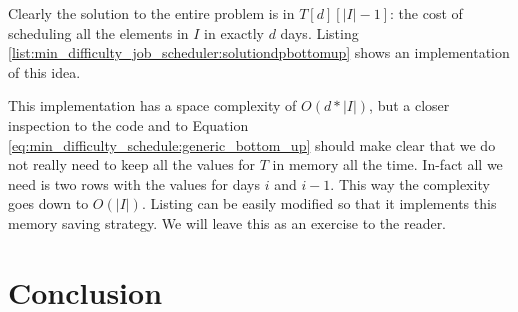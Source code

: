 Clearly the solution to the entire problem is in $T[d][|I|-1]$: the cost of scheduling all the
elements in $I$ in exactly $d$ days. Listing
\ref{list:min_difficulty_job_scheduler:solutiondpbottomup} shows an implementation of this idea.



This implementation has a space complexity of $O(d*|I|)$, but a closer inspection to the code and to
Equation \ref{eq:min_difficulty_schedule:generic_bottom_up} should make clear that we do not really
need to keep all the values for $T$ in memory all the time. In-fact all we need is two rows with the
values for days $i$ and $i-1$. This way the complexity goes down to $O(|I|)$. Listing can be easily
modified so that it implements this memory saving strategy. We will leave this as an exercise to the
reader.


\section{Conclusion}